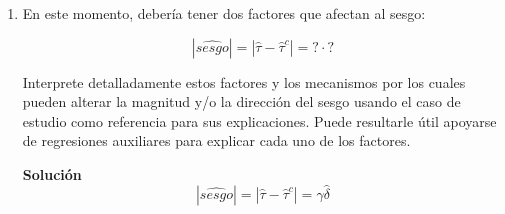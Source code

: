 \documentclass[a4paper, answers, addpoints, 11pt]{exam}
\begin{document}
\begin{enumerate} [resume]
\begin{mdframed}
\begin{proof}
\begin{align*}
    \hat{\tau} &= \frac{\operatorname{cov}(\tilde{victim}, \tilde{peace})}{\operatorname{var}(\tilde{victim})} \qquad \text{(Por A1)}\\
    &= \frac{\operatorname{cov}(\tilde{victim}, \hat{\tau}^c \tilde{victim} + \hat{\gamma} \tilde{center})}{\operatorname{var}(\tilde{victim}_i)} \qquad \text{(Usando  la estimación de \ref{aniquilacionx})} \\
     &= \hat{\tau}^c \frac{\operatorname{var}(\tilde{victim})}{\operatorname{var}(\tilde{victim})} + \frac{\operatorname{cov}(\tilde{victim}, \hat{\gamma} \tilde{center})}{\operatorname{var}(\tilde{victim})} \\
    &= \hat{\tau}^c + \hat{\gamma} \left( \frac{\operatorname{cov}(\tilde{victim}, \tilde{center})}{\operatorname{var}(\tilde{victim})} \right) \\
    \intertext{Defina $ \hat{\delta} := \frac{\operatorname{cov}(\tilde{victim}, \tilde{center})}{\operatorname{var}(\tilde{victim})}$ entonces}
    &= \hat{\tau}^c+ \hat{\gamma} \hat{\delta}
\end{align*}
Luego hemos mostrado que $\hat{\tau} =\hat{\tau}^c+ \hat{\gamma} \hat{\delta}$. Por tanto $\hat{\tau}$ tiene un sesgo respecto a $\hat{\tau}^c$  y la magnitud va a depender de la correlación entre ser victima y estar en el centro (descontando ya el efecto de los controles).

    \end{proof}
        \end{mdframed}

    \bigskip\item En este momento, debería tener dos factores que afectan al sesgo:
    
    \begin{equation}\label{eq:ovb}
        |\hat{sesgo}| = |\hat\tau - \hat\tau^c| = \mathord{?} \cdot \mathord{?}
    \end{equation}
    
    Interprete detalladamente estos factores y los mecanismos por los cuales pueden alterar la magnitud y/o la dirección del sesgo usando el caso de estudio como referencia para sus explicaciones. Puede resultarle útil apoyarse de regresiones auxiliares para explicar cada uno de los factores.

    \begin{mdframed}
        \textbf{Solución}
        \begin{equation*} 
        |\hat{sesgo}| = |\hat\tau - \hat\tau^c| = \hat{\gamma} \hat{\delta}
    \end{equation*}
       

        \end{mdframed}
      
        

\end{enumerate}
\end{document}
